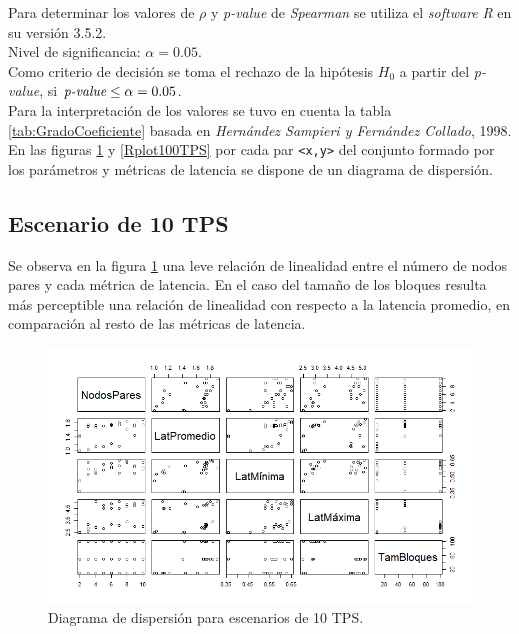 Para determinar los valores de $\rho$ y \emph{p-value} de \emph{Spearman} se utiliza el \emph{software} \emph{R} en su versi\'on 3.5.2.\\

Nivel de significancia: $\alpha = 0.05$.\\

Como criterio de decisi\'on se toma el rechazo de la hip\'otesis $H_0$ a partir del \emph{p-value}, si $\emph{p-value}\leq\alpha = 0.05$.\\

Para la interpretaci\'on de los valores se tuvo en cuenta la tabla \ref{tab:GradoCoeficiente} basada en \emph{Hern\'andez Sampieri y Fern\'andez Collado}, 1998.\\


En las figuras \ref{Rplot10TPS} y \ref{Rplot100TPS} por cada par \texttt{<x,y>} del conjunto formado por los par\'ametros y m\'etricas de latencia se dispone de un diagrama de dispersi\'on.\\
 

\newpage
\subsection{Escenario de 10 TPS}

Se observa en la figura \ref{Rplot10TPS} una leve relaci\'on de linealidad entre el n\'umero de nodos pares y cada m\'etrica de latencia. En el caso del tama\~no de los bloques resulta m\'as perceptible una relaci\'on de linealidad con respecto a la latencia promedio, en comparaci\'on al resto de las m\'etricas de latencia.\\

\begin{figure}[h]
\centering
\includegraphics[scale=0.6]{Graphics/Rplot10TPS.png}
\caption{Diagrama de dispersi\'on para escenarios de 10 TPS.}
\label{Rplot10TPS}
\end{figure}

